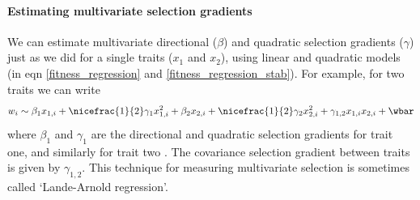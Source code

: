 

\paragraph{Estimating multivariate selection gradients}
We can estimate multivariate directional ($\beta$) and quadratic selection
gradients ($\gamma$) just as we did for a single traits ($x_1$ and $x_2$), using linear
and quadratic models (in eqn \eqref{fitness_regression} and \eqref{fitness_regression_stab}). For example, for two traits we can write
\begin{equation}
w_i \sim \beta_1 x_{1,i} + \nicefrac{1}{2} \gamma_1 x_{1,i}^2 + \beta_2 x_{2,i} + \nicefrac{1}{2} 
\gamma_2 x_{2,i}^2  + \gamma_{1,2} x_{1,i} x_{2,i}  + \wbar \label{fitness_regression_MV}
 \end{equation}
where $\beta_1$ and $\gamma_1$ are the directional and quadratic
selection gradients for trait one, and similarly for trait two \citep{lande1983measurement}. The
covariance selection gradient between traits is given by
$\gamma_{1,2}$. This technique for measuring multivariate selection is
sometimes called `Lande-Arnold regression'.


